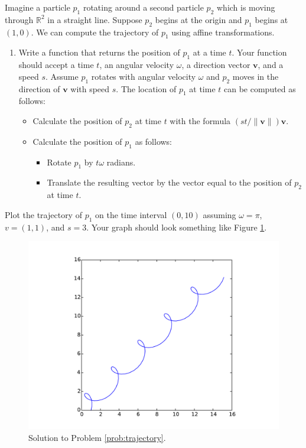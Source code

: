 \begin{problem}
Imagine a particle $p_1$ rotating around a second particle $p_2$ which is moving through $\mathbb{R}^2$ in a straight line.
Suppose $p_2$ begins at the origin and $p_1$ begins at $(1, 0)$.
We can compute the trajectory of $p_1$ using affine transformations.

\begin{enumerate}\label{prob:trajectory}
\item Write a function that returns the position of $p_1$ at a time $t$.
Your function should accept a time $t$, an angular velocity $\omega$, a direction vector $\mathbf{v}$, and a speed $s$.
Assume $p_1$ rotates with angular velocity $\omega$ and $p_2$ moves in the direction of $\mathbf{v}$ with speed $s$.
The location of $p_1$ at time $t$ can be computed as follows:
\begin{itemize}
\item Calculate the position of $p_2$ at time $t$ with the formula $(st/\|\mathbf{v}\|) \mathbf{v}$.
\item Calculate the position of $p_1$ as follows:
\begin{itemize}
\item Rotate $p_1$ by $t\omega$ radians.
\item Translate the resulting vector by the vector equal to the position of $p_2$ at time $t$.
\end{itemize}
\end{itemize}
\end{enumerate}
\item Plot the trajectory of $p_1$ on the time interval $(0, 10)$ assuming $\omega=\pi$, $v=(1, 1)$, and $s=3$.
Your graph should look something like Figure \ref{fig:trajectory}.
\begin{figure}[H]
\includegraphics[width=\textwidth]{trajectory.pdf}
\caption{Solution to Problem \ref{prob:trajectory}.}
\label{fig:trajectory}
\end{figure}
\end{problem}
